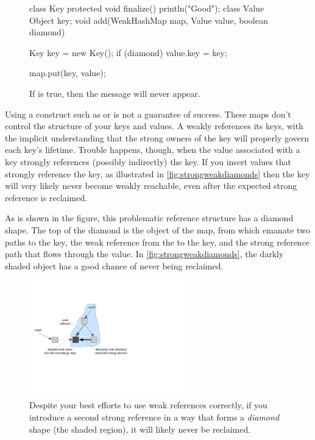 \begin{figure}
\centering
\vspace{-5mm}
\begin{framedlisting}
class Key {
  protected void finalize() {
    println("Good");
  }
}
class Value {
  Object key;
}
void add(WeakHashMap map, Value value, boolean diamond) {
  Key key = new Key();
  if (diamond)
    value.key = key;

  map.put(key, value);
}
\end{framedlisting}
\caption{If  is true, then the 
message will never appear.}
\end{figure}
Using a construct such as  or  is not a
guarantee of success. These maps don't control the structure of your keys and
values. A  weakly references its keys, with the implicit
understanding that the strong owners of the key will properly govern each key's
lifetime. Trouble happens, though, when the value associated with a key strongly
references (possibly indirectly) the key. If you insert values that strongly
reference the key, as illustrated in \autoref{fig:strongweakdiamonds} then the
key will very likely never become weakly reachable, even after the expected
strong reference is reclaimed.

As is shown in the figure, this problematic reference structure has a diamond
shape. The top of the diamond is the  object of the map, from which
emanate two paths to the key, the weak reference from the  to the
key, and the strong reference path that flows through the value. In
\autoref{fig:strongweakdiamonds}, the darkly shaded object has a good chance of
never being reclaimed. 

\begin{figure}   %
\centering
	\includegraphics[width=0.6\textwidth]{part2/Figures/lifetime/strongweakdiamonds}
	\caption{Despite your best efforts to use weak references correctly, if you
	introduce a second strong reference in a way that forms a
	\emph{diamond} shape (the shaded region), it will likely never be reclaimed.}
	\label{fig:strongweakdiamonds}
\end{figure}



